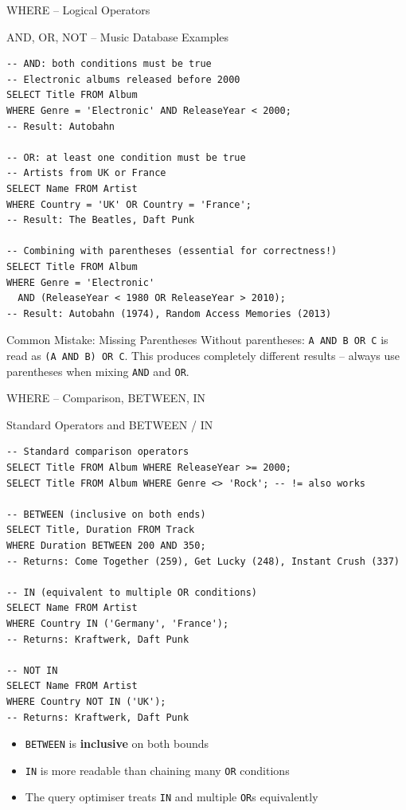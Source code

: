 \begin{frame}[fragile]{WHERE -- Logical Operators}
  \begin{block}{AND, OR, NOT -- Music Database Examples}
\begin{lstlisting}[style=sqlstyle]
-- AND: both conditions must be true
-- Electronic albums released before 2000
SELECT Title FROM Album
WHERE Genre = 'Electronic' AND ReleaseYear < 2000;
-- Result: Autobahn

-- OR: at least one condition must be true
-- Artists from UK or France
SELECT Name FROM Artist
WHERE Country = 'UK' OR Country = 'France';
-- Result: The Beatles, Daft Punk

-- Combining with parentheses (essential for correctness!)
SELECT Title FROM Album
WHERE Genre = 'Electronic'
  AND (ReleaseYear < 1980 OR ReleaseYear > 2010);
-- Result: Autobahn (1974), Random Access Memories (2013)
\end{lstlisting}
  \end{block}

  \begin{alertblock}{Common Mistake: Missing Parentheses}
    Without parentheses: \texttt{A AND B OR C} is read as \texttt{(A AND B) OR C}.
    This produces completely different results -- always use parentheses when
    mixing \texttt{AND} and \texttt{OR}.
  \end{alertblock}
\end{frame}

\begin{frame}[fragile]{WHERE -- Comparison, BETWEEN, IN}
  \begin{block}{Standard Operators and BETWEEN / IN}
\begin{lstlisting}[style=sqlstyle]
-- Standard comparison operators
SELECT Title FROM Album WHERE ReleaseYear >= 2000;
SELECT Title FROM Album WHERE Genre <> 'Rock'; -- != also works

-- BETWEEN (inclusive on both ends)
SELECT Title, Duration FROM Track
WHERE Duration BETWEEN 200 AND 350;
-- Returns: Come Together (259), Get Lucky (248), Instant Crush (337)

-- IN (equivalent to multiple OR conditions)
SELECT Name FROM Artist
WHERE Country IN ('Germany', 'France');
-- Returns: Kraftwerk, Daft Punk

-- NOT IN
SELECT Name FROM Artist
WHERE Country NOT IN ('UK');
-- Returns: Kraftwerk, Daft Punk
\end{lstlisting}
  \end{block}

  \begin{itemize}
    \item \texttt{BETWEEN} is \textbf{inclusive} on both bounds
    \item \texttt{IN} is more readable than chaining many \texttt{OR} conditions
    \item The query optimiser treats \texttt{IN} and multiple \texttt{OR}s equivalently
  \end{itemize}
\end{frame}

